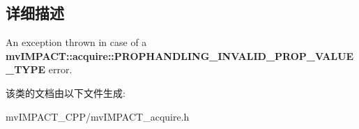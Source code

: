 \subsection{详细描述}
An exception thrown in case of a {\bfseries mv\+I\+M\+P\+A\+C\+T\+::acquire\+::\+P\+R\+O\+P\+H\+A\+N\+D\+L\+I\+N\+G\+\_\+\+I\+N\+V\+A\+L\+I\+D\+\_\+\+P\+R\+O\+P\+\_\+\+V\+A\+L\+U\+E\+\_\+\+T\+Y\+P\+E} error. 

该类的文档由以下文件生成\+:\begin{DoxyCompactItemize}
\item 
mv\+I\+M\+P\+A\+C\+T\+\_\+\+C\+P\+P/mv\+I\+M\+P\+A\+C\+T\+\_\+acquire.\+h\end{DoxyCompactItemize}

